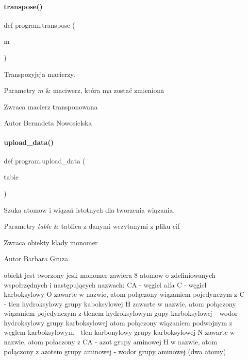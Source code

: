 \paragraph{transpose()}
{\footnotesize\ttfamily def program.\+transpose (\begin{DoxyParamCaption}\item[{}]{m }\end{DoxyParamCaption})}



Transpozyjcja macierzy. 


\begin{DoxyParams}{Parametry}
{\em m} & maciwerz, która ma zostać zmieniona \\
\hline
\end{DoxyParams}
\begin{DoxyReturn}{Zwraca}
macierz transponowana 
\end{DoxyReturn}
\begin{DoxyAuthor}{Autor}
Bernadeta Nowosielska 
\end{DoxyAuthor}
\mbox{\label{namespaceprogram_a6916e63ac5b44ed1b9a69a3bcae5575e}} 
\paragraph{upload\+\_\+data()}
{\footnotesize\ttfamily def program.\+upload\+\_\+data (\begin{DoxyParamCaption}\item[{}]{table }\end{DoxyParamCaption})}



Szuka atomow i wiązań istotnych dla tworzenia wiązania. 


\begin{DoxyParams}{Parametry}
{\em table} & tablica z danymi wczytanymi z pliku cif \\
\hline
\end{DoxyParams}
\begin{DoxyReturn}{Zwraca}
obiekty klady monomer 
\end{DoxyReturn}
\begin{DoxyAuthor}{Autor}
Barbara Gruza
\end{DoxyAuthor}
obiekt jest tworzony jesli monomer zawiera 8 atomow o zdefiniowanych wspołrzędnych i następujących nazwach\+: \textquotesingle{}CA\textquotesingle{} -\/ węgiel alfa \textquotesingle{}C\textquotesingle{} -\/ węgiel karboksylowy O zawarte w nazwie, atom połączony wiązaniem pojedynczym z \textquotesingle{}C\textquotesingle{} -\/ tlen hydroksylowy grupy kaboksylowej H zawarte w nazwie, atom połączony wiązaniem pojedynczym z tlenem hydroksylowym gupy karboksylowej -\/ wodor hydroksylowy grupy karboksylowej atom połączony wiązaniem podwojnym z węglem karboksylowym -\/ tlen karbonylowy grupy karboksylowej N zawarte w nazwie, atom połaczony z \textquotesingle{}CA\textquotesingle{} -\/ azot grupy aminowej H w nazwie, atom połączony z azotem grupy aminowej -\/ wodor grupy aminowej (dwa atomy) 

